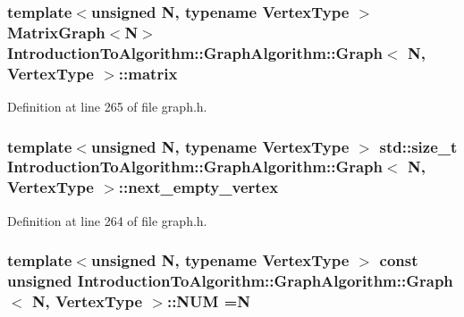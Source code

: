 \subsubsection[{matrix}]{\setlength{\rightskip}{0pt plus 5cm}template$<$unsigned N, typename Vertex\+Type $>$ {\bf Matrix\+Graph}$<$N$>$ {\bf Introduction\+To\+Algorithm\+::\+Graph\+Algorithm\+::\+Graph}$<$ N, Vertex\+Type $>$\+::matrix}\label{struct_introduction_to_algorithm_1_1_graph_algorithm_1_1_graph_abf4186d5ed3b2c93da5f7fef6342f987}


Definition at line 265 of file graph.\+h.

\hypertarget{struct_introduction_to_algorithm_1_1_graph_algorithm_1_1_graph_a5bed015eecaef2f404e8497978043038}{}
\subsubsection[{next\+\_\+empty\+\_\+vertex}]{\setlength{\rightskip}{0pt plus 5cm}template$<$unsigned N, typename Vertex\+Type $>$ std\+::size\+\_\+t {\bf Introduction\+To\+Algorithm\+::\+Graph\+Algorithm\+::\+Graph}$<$ N, Vertex\+Type $>$\+::next\+\_\+empty\+\_\+vertex}\label{struct_introduction_to_algorithm_1_1_graph_algorithm_1_1_graph_a5bed015eecaef2f404e8497978043038}


Definition at line 264 of file graph.\+h.

\hypertarget{struct_introduction_to_algorithm_1_1_graph_algorithm_1_1_graph_a42850b5cb5e754cb4e6e67ae1aa53197}{}
\subsubsection[{N\+U\+M}]{\setlength{\rightskip}{0pt plus 5cm}template$<$unsigned N, typename Vertex\+Type $>$ const unsigned {\bf Introduction\+To\+Algorithm\+::\+Graph\+Algorithm\+::\+Graph}$<$ N, Vertex\+Type $>$\+::N\+U\+M =N\hspace{0.3cm}{\ttfamily [static]}}\label{struct_introduction_to_algorithm_1_1_graph_algorithm_1_1_graph_a42850b5cb5e754cb4e6e67ae1aa53197}


